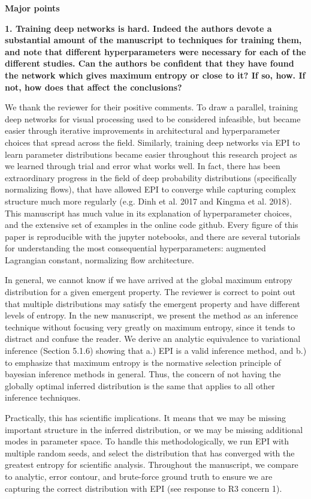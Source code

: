 \documentclass[11pt,a4paper]{article}
\begin{document}
\textbf{Major points }

\textbf{1. Training deep networks is hard. Indeed the authors devote a substantial amount of the manuscript to techniques for training them, and note that different hyperparameters were necessary for each of the different studies. Can the authors be confident that they have found the network which gives maximum entropy or close to it? If so, how. If not, how does that affect the conclusions? }

We thank the reviewer for their positive comments.  
To draw a parallel, training deep networks for visual processing used to be considered infeasible, but became easier through iterative improvements in architectural and hyperparameter choices that spread across the field.  
Similarly, training deep networks via EPI to learn parameter distributions became easier throughout this research project as we learned through trial and error what works well.  
In fact, there has been extraordinary progress in the field of deep probability distributions (specifically normalizing flows), that have allowed EPI to converge while capturing complex structure much more regularly (e.g. Dinh et al. 2017 and Kingma et al. 2018).  
This manuscript has much value in its explanation of hyperparameter choices, and the extensive set of examples in the online code github. 
Every figure of this paper is reproducible with the jupyter notebooks, and there are several tutorials for understanding the most consequential hyperparameters: augmented Lagrangian constant, normalizing flow architecture.  

In general, we cannot know if we have arrived at the global maximum entropy distribution for a given emergent property.  
The reviewer is correct to point out that multiple distributions may satisfy the emergent property and have different levels of entropy.  
In the new manuscript, we present the method as an inference technique without focusing very greatly on maximum entropy, since it tends to distract and confuse the reader.  
We derive an analytic equivalence to variational inference (Section 5.1.6) showing that a.) EPI is a valid inference method, and b.) to emphasize that maximum entropy is the normative selection principle of bayesian inference methods in general. 
Thus, the concern of not having the globally optimal inferred distribution is the same that applies to all other inference techniques.

Practically, this has scientific implications.  
It means that we may be missing important structure in the inferred distribution, or we may be missing additional modes in parameter space.  
To handle this methodologically, we run EPI with multiple random seeds, and select the distribution that has converged with the greatest entropy for scientific analysis.
Throughout the manuscript, we compare to analytic, error contour, and brute-force ground truth to ensure we are capturing the correct distribution with EPI (see response to R3 concern 1).
\end{document}
